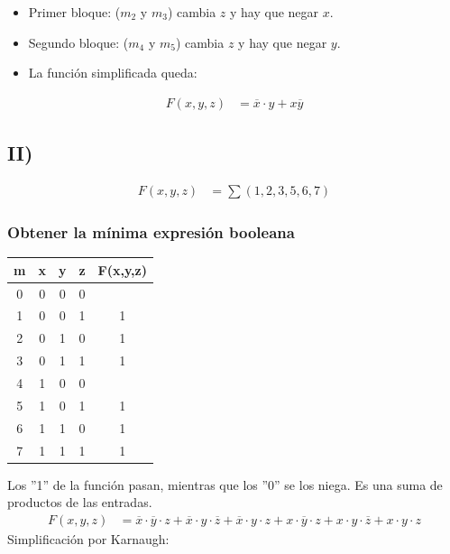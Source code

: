 \begin{itemize}[nosep] \item Primer bloque: ($m_2$ y $m_3$) cambia $z$ y hay que negar $x$.
\item Segundo bloque: ($m_4$ y $m_5$) cambia $z$ y hay que negar $y$.
\item La función simplificada queda:\end{itemize}
    {\Large\begin{align*}
    F(x,y,z) &= \overline{x}\cdot y + x\overline{y}
\end{align*}}

\subsection{II)}

{\noindent\Large\begin{align*}\displaystyle F(x, y, z) &= \sum(1, 2, 3, 5, 6, 7)\end{align*}}
\subsubsection{Obtener la mínima expresión booleana}
\begin{center}
\begin{tabular}{c|ccc|c}
\rowcolor[HTML]{FFCCC9} 
\cellcolor[HTML]{9AFF99}m & x & y & z & \cellcolor[HTML]{FFFFC7}F(x,y,z) \\ \hline
0                         & 0 & 0 & 0 &                                  \\
1                         & 0 & 0 & 1 & 1                                \\
2                         & 0 & 1 & 0 & 1                                \\
3                         & 0 & 1 & 1 & 1                                \\
4                         & 1 & 0 & 0 &                                  \\
5                         & 1 & 0 & 1 & 1                                \\
6                         & 1 & 1 & 0 & 1                                \\
7                         & 1 & 1 & 1 & 1                               
\end{tabular}
\end{center}
\noindent Los ''1'' de la función pasan, mientras que los ''0'' se los niega. Es una suma de productos de las entradas.
{\Large\begin{align*}
    F(x,y,z) &= \overline{x}\cdot\overline{y}\cdot z + \overline{x}\cdot y\cdot\overline{z} + \overline{x}\cdot y\cdot z + x\cdot\overline{y}\cdot z + x\cdot y\cdot\overline{z} + x\cdot y\cdot z
\end{align*}}
\noindent Simplificación por Karnaugh:

